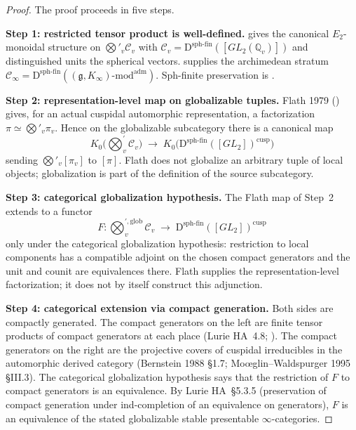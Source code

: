 \begin{proof}
The proof proceeds in five steps.

\textbf{Step 1: restricted tensor product is well-defined.}
 gives the canonical
\(E_{2}\)-monoidal structure on
\(\bigotimes'_{v}\mathcal{C}_{v}\) with
\(\mathcal{C}_{v}=\mathrm{D}^{\mathrm{sph\text{-}fin}}([GL_{2}(\mathbb{Q}_{v})])\)
and distinguished units the spherical vectors.
 supplies the archimedean stratum
\(\mathcal{C}_{\infty}=\mathrm{D}^{\mathrm{sph\text{-}fin}}((\mathfrak{g},K_{\infty})\text{-mod}^{\mathrm{adm}})\).
Sph-finite preservation is
.

\textbf{Step 2: representation-level map on globalizable tuples.}
Flath 1979 () gives, for an actual
cuspidal automorphic representation, a factorization
\(\pi\simeq\bigotimes'_v\pi_v\). Hence on the globalizable subcategory
there is a canonical map
\[
K_{0}\bigl(\bigotimes_{v}^{\prime}\mathcal{C}_{v}\bigr)
\;\longrightarrow\;
K_{0}\bigl(\mathrm{D}^{\mathrm{sph\text{-}fin}}([GL_{2}])^{\mathrm{cusp}}\bigr)
\]
sending \(\bigotimes'_{v}[\pi_{v}]\) to \([\pi]\). Flath does not
globalize an arbitrary tuple of local objects; globalization is part
of the definition of the source subcategory.

\textbf{Step 3: categorical globalization hypothesis.} The Flath map
of Step~2 extends to a functor
\[
F\colon
\bigotimes_{v}^{\prime,\mathrm{glob}}\mathcal{C}_{v}
\;\longrightarrow\;
\mathrm{D}^{\mathrm{sph\text{-}fin}}([GL_{2}])^{\mathrm{cusp}}
\]
only under the categorical globalization hypothesis: restriction to
local components has a compatible adjoint on the chosen compact
generators and the unit and counit are equivalences there. Flath
supplies the representation-level factorization; it does not by itself
construct this adjunction.

\textbf{Step 4: categorical extension via compact generation.}
Both sides are compactly generated. The compact generators on the
left are finite tensor products of compact generators at each place
(Lurie HA~4.8; ). The compact
generators on the right are the projective covers of cuspidal
irreducibles in the automorphic derived category (Bernstein 1988
\S 1.7; Mo{\oe}glin--Waldspurger 1995 \S III.3). The categorical
globalization hypothesis says that the restriction of \(F\) to compact
generators is an equivalence. By Lurie HA~\S 5.3.5 (preservation of
compact generation under ind-completion of an equivalence on
generators), \(F\) is an equivalence of the stated globalizable stable
presentable \(\infty\)-categories.


\end{proof}
